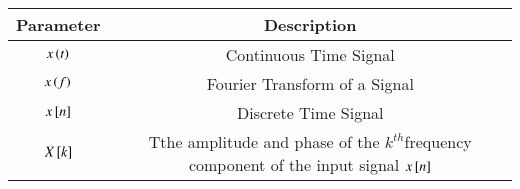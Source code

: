 \begin{tabular}{|c|c|}
\hline
Parameter & Description \\
\hline
$x\left(t\right)$  & Continuous Time  Signal\\
\hline
$x\left(f\right)$ & Fourier Transform of a Signal \\
\hline
$x{}\left[n\right]$ & Discrete Time Signal\\
\hline
$X{}\left[k\right]$ &  Tthe amplitude and phase of the $k^{th}$frequency component of the input signal $x{}\left[n\right]$\\
\hline
\end{tabular}